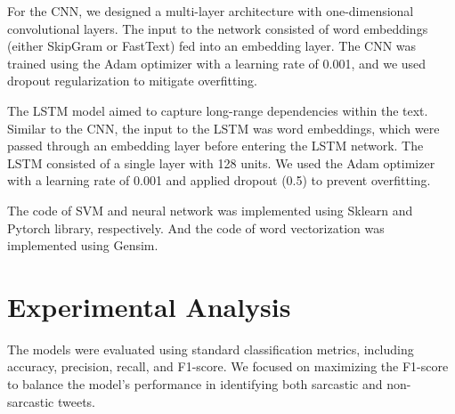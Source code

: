 \documentclass[11pt]{article}
\begin{document}
For the CNN, we designed a multi-layer architecture with one-dimensional convolutional layers. The input to the network consisted of word embeddings (either SkipGram or FastText) fed into an embedding layer. The CNN was trained using the Adam optimizer with a learning rate of 0.001, and we used dropout regularization to mitigate overfitting.

The LSTM model aimed to capture long-range dependencies within the text. Similar to the CNN, the input to the LSTM was word embeddings, which were passed through an embedding layer before entering the LSTM network. The LSTM consisted of a single layer with 128 units. We used the Adam optimizer with a learning rate of 0.001 and applied dropout (0.5) to prevent overfitting.

The code of SVM and neural network was implemented using Sklearn and Pytorch library, respectively. And the code of word vectorization was implemented using Gensim.

\section{Experimental Analysis}
The models were evaluated using standard classification metrics, including accuracy, precision, recall, and F1-score. We focused on maximizing the F1-score to balance the model’s performance in identifying both sarcastic and non-sarcastic tweets. 
\end{document}

